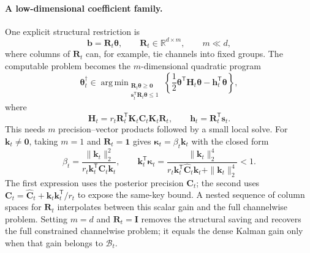 \documentclass[11pt]{article}
\newcommand{\vct}[1]{\boldsymbol{#1}}
\newcommand{\tr}{\mathsf{T}}
\newcommand{\R}{\mathbb{R}}
\DeclareMathOperator*{\argmin}{arg\,min}
\begin{document}
\paragraph{A low-dimensional coefficient family.}
One explicit structural restriction is
\begin{equation}
  \vct{b}=\vct{R}_t\vct{\theta},
  \qquad \vct{R}_t\in\R^{d\times m},
  \qquad m\ll d,
  \label{eq:tied-coefficient-family}
\end{equation}
where columns of $\vct{R}_t$ can, for example, tie channels into fixed groups.
The computable problem becomes the $m$-dimensional quadratic program
\begin{equation}
  \vct{\theta}_t^\dagger
  \in\argmin_{\substack{\vct{R}_t\vct{\theta}\geq\vct{0}\\
               \vct{s}_t^{\tr}\vct{R}_t\vct{\theta}\leq1}}
  \left\{
  \frac12\vct{\theta}^{\tr}\vct{H}_t\vct{\theta}
  -\vct{h}_t^{\tr}\vct{\theta}\right\},
  \label{eq:grouped-gain-problem}
\end{equation}
where
\begin{equation}
  \vct{H}_t
  =r_t\vct{R}_t^{\tr}\vct{K}_t\vct{C}_t\vct{K}_t\vct{R}_t,
  \qquad
  \vct{h}_t=\vct{R}_t^{\tr}\vct{s}_t.
\end{equation}
This needs $m$ precision--vector products followed by a small local solve.  For
$\vct{k}_t\neq\vct{0}$, taking $m=1$ and $\vct{R}_t=\vct{1}$ gives
$\vct{\kappa}_t=\beta_t\vct{k}_t$ with the closed form
\begin{equation}
  \boxed{
  \beta_t
  =\frac{\|\vct{k}_t\|_2^2}
  {r_t\vct{k}_t^{\tr}\vct{C}_t\vct{k}_t},
  \qquad
  \vct{k}_t^{\tr}\vct{\kappa}_t
  =\frac{\|\vct{k}_t\|_2^4}
  {r_t\vct{k}_t^{\tr}\widehat{\vct{C}}_t\vct{k}_t
   +\|\vct{k}_t\|_2^4}<1.}
  \label{eq:scalar-galerkin-gain}
\end{equation}
The first expression uses the posterior precision $\vct{C}_t$; the second uses
$\vct{C}_t=\widehat{\vct{C}}_t+\vct{k}_t\vct{k}_t^{\tr}/r_t$ to expose the
same-key bound.  A nested sequence of column spaces for $\vct{R}_t$
interpolates between this scalar gain and the full channelwise problem.
Setting $m=d$ and $\vct{R}_t=\vct{I}$ removes the structural saving and
recovers the full constrained channelwise problem; it equals the dense Kalman
gain only when that gain belongs to $\mathcal B_t$.
\end{document}
